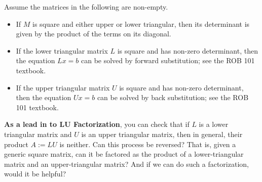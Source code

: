 \begin{fact} Assume the matrices in the following are non-empty.
\begin{itemize}
    \item If $M$ is square and either upper or lower triangular, then its determinant is given by the product of the terms on its diagonal.
    \item If the lower triangular matrix $L$ is square and has non-zero determinant, then the equation $Lx = b$ can be solved by forward substitution; see the ROB 101 textbook.
       \item If the upper triangular matrix $U$ is square and has non-zero determinant, then the equation $Ux = b$ can be solved by back substitution; see the ROB 101 textbook.
    \end{itemize}
\end{fact}

\textbf{As a lead in to LU Factorization}, you can check that if $L$ is a lower triangular matrix and $U$ is an upper triangular matrix, then in general, their product  $A:= L U$ is neither. Can this process be reversed? That is, given a generic square matrix, can it be factored as the product of a lower-triangular matrix and an upper-triangular matrix? And if we can do such a factorization, would it be helpful?\\


